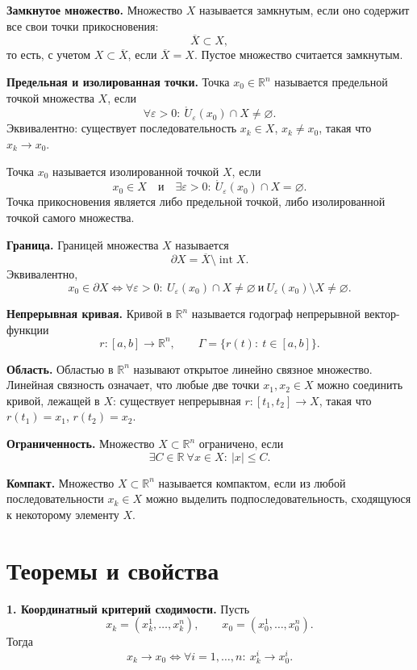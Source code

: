 \documentclass[12pt,a4paper]{article}
\newcommand{\R}{\mathbb{R}}
\newcommand{\eps}{\varepsilon}
\newcommand{\Ball}[2]{U_{#1}(#2)}
\newcommand{\PBall}[2]{\mathring U_{#1}(#2)}
\begin{document}
\textbf{Замкнутое множество.}
Множество \(X\) называется замкнутым, если оно содержит все свои точки
прикосновения:
\[
  \overline X\subset X,
\]
то есть, с учетом \(X\subset\overline X\), если \(\overline X=X\). Пустое
множество считается замкнутым.

\textbf{Предельная и изолированная точки.}
Точка \(x_0\in\R^n\) называется предельной точкой множества \(X\), если
\[
  \forall \eps>0:\ \PBall{\eps}{x_0}\cap X\ne\varnothing.
\]
Эквивалентно: существует последовательность \(x_k\in X\), \(x_k\ne x_0\),
такая что \(x_k\to x_0\).

Точка \(x_0\) называется изолированной точкой \(X\), если
\[
  x_0\in X
  \quad\text{и}\quad
  \exists \eps>0:\ \PBall{\eps}{x_0}\cap X=\varnothing.
\]
Точка прикосновения является либо предельной точкой, либо изолированной
точкой самого множества.

\textbf{Граница.}
Границей множества \(X\) называется
\[
  \partial X=\overline X\setminus \operatorname{int}X.
\]
Эквивалентно,
\[
  x_0\in\partial X
  \Longleftrightarrow
  \forall \eps>0:\ \Ball{\eps}{x_0}\cap X\ne\varnothing
  \ \text{и}\ 
  \Ball{\eps}{x_0}\setminus X\ne\varnothing.
\]

\textbf{Непрерывная кривая.}
Кривой в \(\R^n\) называется годограф непрерывной вектор-функции
\[
  r:[a,b]\to\R^n,\qquad
  \Gamma=\{r(t):\ t\in[a,b]\}.
\]

\textbf{Область.}
Областью в \(\R^n\) называют открытое линейно связное множество. Линейная
связность означает, что любые две точки \(x_1,x_2\in X\) можно соединить
кривой, лежащей в \(X\): существует непрерывная \(r:[t_1,t_2]\to X\), такая
что \(r(t_1)=x_1\), \(r(t_2)=x_2\).

\textbf{Ограниченность.}
Множество \(X\subset\R^n\) ограничено, если
\[
  \exists C\in\R\ \forall x\in X:\ |x|\le C.
\]

\textbf{Компакт.}
Множество \(X\subset\R^n\) называется компактом, если из любой
последовательности \(x_k\in X\) можно выделить подпоследовательность,
сходящуюся к некоторому элементу \(X\).

\section*{Теоремы и свойства}

\textbf{1. Координатный критерий сходимости.}
Пусть
\[
  x_k=(x_k^1,\dots,x_k^n), \qquad x_0=(x_0^1,\dots,x_0^n).
\]
Тогда
\[
  x_k\to x_0
  \Longleftrightarrow
  \forall i=1,\dots,n:\ x_k^i\to x_0^i.
\]
\end{document}

